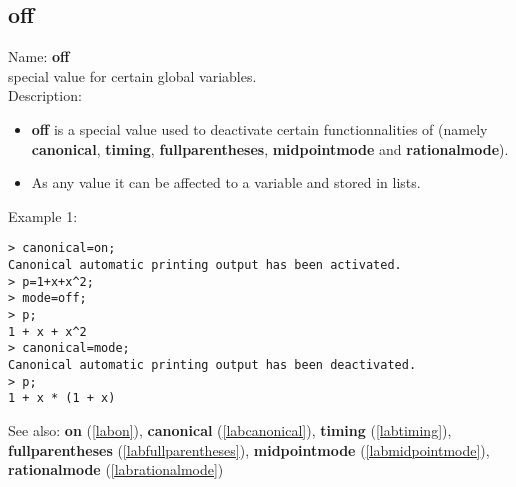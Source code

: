 \subsection{off}
\label{laboff}
\noindent Name: \textbf{off}\\
special value for certain global variables.\\
\noindent Description: \begin{itemize}

\item \textbf{off} is a special value used to deactivate certain functionnalities
   of \sollya (namely \textbf{canonical}, \textbf{timing}, \textbf{fullparentheses}, \textbf{midpointmode} and \textbf{rationalmode}).

\item As any value it can be affected to a variable and stored in lists.
\end{itemize}
\noindent Example 1: 
\begin{center}\begin{minipage}{15cm}\begin{Verbatim}[frame=single]
> canonical=on;
Canonical automatic printing output has been activated.
> p=1+x+x^2;
> mode=off;
> p;
1 + x + x^2
> canonical=mode;
Canonical automatic printing output has been deactivated.
> p;
1 + x * (1 + x)
\end{Verbatim}
\end{minipage}\end{center}
See also: \textbf{on} (\ref{labon}), \textbf{canonical} (\ref{labcanonical}), \textbf{timing} (\ref{labtiming}), \textbf{fullparentheses} (\ref{labfullparentheses}), \textbf{midpointmode} (\ref{labmidpointmode}), \textbf{rationalmode} (\ref{labrationalmode})
